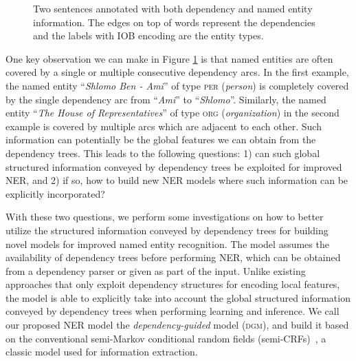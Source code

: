 \begin{figure}[h!]
\begin{subfigure}[b]{\linewidth}
	\end{subfigure}
	\caption{Two sentences annotated with both dependency and named entity information. The edges on top of words represent the dependencies and the labels with IOB encoding are the entity types.}
	\label{fig:dgmexample}
\end{figure}


One key observation we can make in Figure \ref{fig:dgmexample} is that named entities are often covered by a single or multiple consecutive dependency arcs.
In the first example, the named entity ``{\em Shlomo Ben - Ami}'' of type \textsc{per} ({\em person}) is completely covered by the single dependency arc from ``{\em Ami}'' to ``{\em Shlomo}''. 
Similarly, the named entity ``{\em The House of Representatives}'' of type \textsc{org} ({\em organization}) in the second example is covered by multiple  arcs which are adjacent to each other. 
Such information can potentially be the global features we can obtain from the dependency trees. 
This leads to the following questions: 1) can such global structured information conveyed by dependency trees be exploited for improved NER, and 2) if so, how to build new NER models where such information can be explicitly incorporated?

With these two questions,  we perform some investigations on how to better utilize the structured information conveyed by dependency trees for building novel models for improved named entity recognition.
The model assumes the availability of dependency trees before performing NER, which can be obtained from a dependency parser or given as part of the input.
Unlike existing approaches that only exploit dependency structures for encoding local features, the model is able to explicitly take into account the global  structured information conveyed by dependency trees when performing learning and inference.
We call our proposed NER model the {\em dependency-guided} model (\textsc{dgm}), and build it based on the conventional semi-Markov conditional random fields (semi-CRFs)~\cite{sarawagi2004semi}, a classic model used for information extraction.

